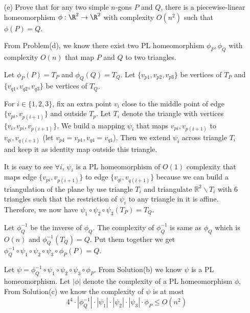 \documentclass[11pt]{article}
\begin{document}
\begin{enumerate}[(a)]
  \item[(e)]
    Prove that for any two simple \(n\)-gons \(P\) and \(Q\), there is a piecewise-linear
    homeomorphism \(\phi : \R^2 \to \R^2\) with complexity \(O(n^2)\) such that \(\phi(P) = Q\).

\begin{solution}
  From Problem(d), we know there exist two PL homeomorphism \(\phi_P,\phi_Q\) with complexity \(O(n)\) that map \(P\) and \(Q\) to two triangles.

  Let \(\phi_P(P)=T_P\) and \(\phi_Q(Q)=T_Q\). Let \(\{v_{p1},v_{p2},v_{p3}\}\) be vertices of \(T_P\) and \(\{v_{q1},v_{q2},v_{q3}\}\) be vertices of \(T_Q\).

  For \(i\in\{1,2,3\}\), fix an extra point \(v_i\) close to the middle point of edge \(\{v_{pi},v_{p(i+1)}\}\) and outside \(T_p\).
  Let \(T_i\) denote the triangle with vertices \(\{v_i,v_{pi},v_{p(i+1)}\}\).
  We build a mapping \(\psi_i\) that maps \(v_{pi},v_{p(i+1)}\) to \(v_{qi},v_{q(i+1)}\) (let \(v_{p4}=v_{p1}, v_{q4}=v_{q1}\)).
  Then we extend \(\psi_i\) across triangle \(T_i\) and keep it as identity map outside this triangle.

  It is easy to see \(\forall i\), \(\psi_i\) is a PL homeomorphism of \(O(1)\) complexity that maps edge \(\{v_{pi},v_{p(i+1)}\}\) to edge \(\{v_{qi},v_{q(i+1)}\}\) because we can build a triangulation of the plane by use triangle \(T_i\) and triangulate \(\mathbb{R}^2\backslash T_i\) with \(6\) triangles such that the restriction of \(\psi_i\) to any triangle in it is affine.
  Therefore, we now have \(\psi_1\circ\psi_2\circ \psi_3(T_P)=T_Q\).

  Let \(\phi^{-1}_Q\) be the inverse of \(\phi_Q\).
  The complexity of \(\phi^{-1}_Q\) is same as \(\phi_Q\) which is \(O(n)\) and \(\phi^{-1}_Q(T_Q)=Q\).
  Put them together we get \(\phi^{-1}_Q\circ\psi_1\circ\psi_2\circ\psi_3\circ\phi_P(P)=Q\).

  Let \(\psi=\phi^{-1}_Q\circ\psi_1\circ\psi_2\circ\psi_3\circ\phi_P\).
  From Solution(b) we know \(\psi\) is a PL homeomorphism.
  Let \(|\phi|\) denote the complexity of a PL homeomorphism \(\phi\).
  From Solution(c) we know the complexity of \(\psi\) is at most
  \[4^4\cdot|\phi^{-1}_Q|\cdot|\psi_1|\cdot|\psi_2|\cdot|\psi_3|\cdot\phi_P\le O(n^2)\]


\end{solution}
\end{enumerate}
\end{document}
